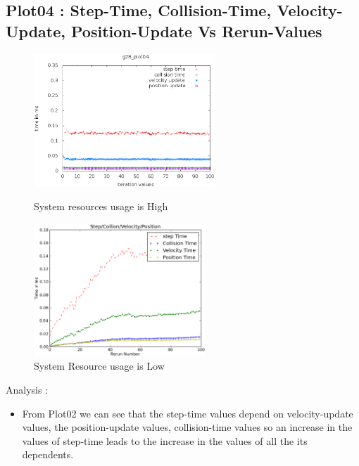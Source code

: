 \documentclass[a4paper,11pt]{article}
\begin{document}
\subsection{Plot04 : Step-Time, Collision-Time, Velocity-Update, Position-Update Vs Rerun-Values}
\begin{figure}[ht]
	\begin{minipage}[ht]{0.5\linewidth}
	\includegraphics[height=50mm]{plots/g28_project_plot04.eps}
	\caption{System resources usage is High }		
	\end{minipage}	
	\begin{minipage}[ht]{0.5\linewidth}
	\includegraphics[height=50mm]{plots1/g28_project_plot04.eps}
	\caption{System Resource usage is Low }		
	\end{minipage}	
	\end{figure}
		Analysis :
	\begin{itemize}
	\item From Plot02 we can see that the step-time values depend on velocity-update 	
	values, the position-update values, collision-time values so an increase in the 
	values of step-time leads to the increase in the values of all the its dependents.
	\end{itemize}
\end{document}
